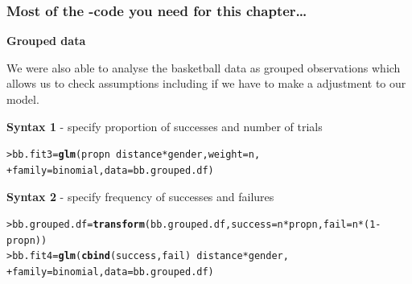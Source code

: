 \documentclass{beamer}\usepackage[]{graphicx}\usepackage[]{xcolor}
\makeatletter
\newcommand{\hlnum}[1]{\textcolor[rgb]{0.686,0.059,0.569}{#1}}%
\newcommand{\hlopt}[1]{\textcolor[rgb]{0,0,0}{#1}}%
\newcommand{\hlstd}[1]{\textcolor[rgb]{0.345,0.345,0.345}{#1}}%
\newcommand{\hlkwb}[1]{\textcolor[rgb]{0.69,0.353,0.396}{#1}}%
\newcommand{\hlkwc}[1]{\textcolor[rgb]{0.333,0.667,0.333}{#1}}%
\newcommand{\hlkwd}[1]{\textcolor[rgb]{0.737,0.353,0.396}{\textbf{#1}}}%
\newenvironment{kframe}{%
 \def\at@end@of@kframe{}%
 \ifinner\ifhmode%
  \def\at@end@of@kframe{\end{minipage}}%
  \begin{minipage}{\columnwidth}%
 \fi\fi%
 \def\FrameCommand##1{\hskip\@totalleftmargin \hskip-\fboxsep
 \colorbox{shadecolor}{##1}\hskip-\fboxsep
     \hskip-\linewidth \hskip-\@totalleftmargin \hskip\columnwidth}%
 \MakeFramed {\advance\hsize-\width
   \@totalleftmargin\z@ \linewidth\hsize
   \@setminipage}}%
 {\par\unskip\endMakeFramed%
 \at@end@of@kframe}
\newenvironment{knitrout}{}{} %
\makeatother
\begin{document}
\begin{frame}[fragile]
\frametitle{Most of the -code you need for this chapter\ldots}

{\bf Grouped data}
\medskip

We were also able to analyse the basketball data as grouped observations which allows us to check assumptions including if we have to make a  adjustment to our model.

\bigskip

{\bf Syntax 1} - specify proportion of successes and number of trials

\begin{knitrout}\scriptsize
{}\color{fgcolor}\begin{kframe}
\begin{alltt}
\hlstd{> }\hlstd{bb.fit3} \hlkwb{=} \hlkwd{glm}\hlstd{(propn} \hlopt{~} \hlstd{distance} \hlopt{*} \hlstd{gender,}\hlkwc{weight}\hlstd{=n,}
\hlstd{+ }              \hlkwc{family} \hlstd{= binomial,}\hlkwc{data} \hlstd{= bb.grouped.df)}
\end{alltt}
\end{kframe}
\end{knitrout}

{\bf Syntax 2} - specify frequency of successes and failures

\begin{knitrout}\scriptsize
{}\color{fgcolor}\begin{kframe}
\begin{alltt}
\hlstd{> }\hlstd{bb.grouped.df} \hlkwb{=} \hlkwd{transform}\hlstd{(bb.grouped.df,} \hlkwc{success}\hlstd{=n}\hlopt{*}\hlstd{propn,} \hlkwc{fail}\hlstd{=n}\hlopt{*}\hlstd{(}\hlnum{1}\hlopt{-}\hlstd{propn))}
\hlstd{> }\hlstd{bb.fit4} \hlkwb{=} \hlkwd{glm}\hlstd{(}\hlkwd{cbind}\hlstd{(success, fail)} \hlopt{~} \hlstd{distance} \hlopt{*} \hlstd{gender,}
\hlstd{+ }              \hlkwc{family} \hlstd{= binomial,}\hlkwc{data} \hlstd{= bb.grouped.df)}
\end{alltt}
\end{kframe}
\end{knitrout}

\end{frame}
\end{document}
